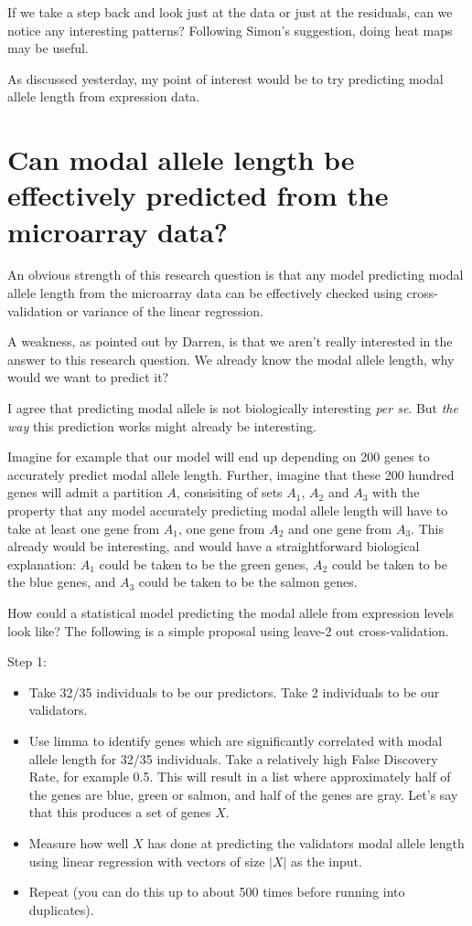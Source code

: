 \documentclass[12pt]{article}
\begin{document}
If we take a step back and look just at the data or just at the residuals, can we notice any interesting patterns? Following Simon's suggestion, doing heat maps may be useful.

As discussed yesterday, my point of interest would be to try predicting modal allele length from expression data.

\section{Can modal allele length be effectively predicted from the microarray data?}

An obvious strength of this research question is that any model predicting modal allele length from the microarray data can be effectively checked using cross-validation or variance of the linear regression.

A weakness, as pointed out by Darren, is that we aren't really interested in the answer to this research question. We already know the modal allele length, why would we want to predict it?

I agree that predicting modal allele is not biologically interesting \textit{per se}. But \textit{the way} this prediction works might already be interesting.

Imagine for example that our model will end up depending on 200 genes to accurately predict modal allele length. Further, imagine that these 200 hundred genes will admit a partition $A$, consisiting of sets $A_{1}$, $A_{2}$ and $A_{3}$ with the property that any model accurately predicting modal allele length will have to take at least one gene from $A_{1}$, one gene from $A_{2}$ and one gene from $A_{3}$. This already would be interesting, and would have a straightforward biological explanation: $A_1$ could be taken to be the green genes, $A_{2}$ could be taken to be the blue genes, and $A_{3}$ could be taken to be the salmon genes.

How could a statistical model predicting the modal allele from expression levels look like? The following is a simple proposal using leave-2 out cross-validation.

Step 1:

\begin{itemize}
  \item Take 32/35 individuals to be our predictors. Take 2 individuals to be our validators.
  \item Use limma to identify genes which are significantly correlated with modal allele length for 32/35 individuals. Take a relatively high False Discovery Rate, for example 0.5. This will result in a list where approximately half of the genes are blue, green or salmon, and half of the genes are gray. Let's say that this produces a set of genes $X$.
  \item Measure how well $X$ has done at predicting the validators modal allele length using linear regression with vectors of size $|X|$ as the input.
  \item Repeat (you can do this up to about 500 times before running into duplicates).
\end{itemize}
\end{document}
